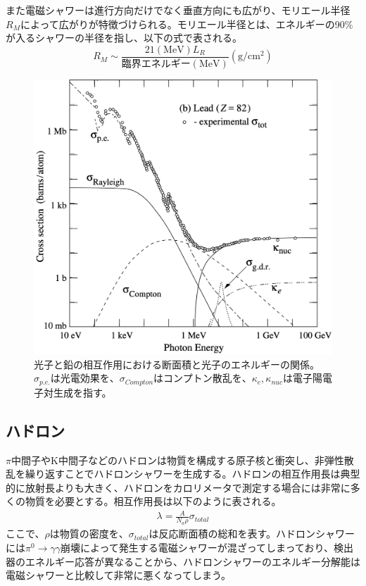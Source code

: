 また電磁シャワーは進行方向だけでなく垂直方向にも広がり、モリエール半径$R_M$によって広がりが特徴づけられる。モリエール半径とは、エネルギーの90$\%$が入るシャワーの半径を指し、以下の式で表される。
\begin{equation}
 \label{moliere}
 R_M \sim \frac{21 (\mathrm{MeV}) L_R}{臨界エネルギー (\mathrm{MeV})}  (\mathrm{g}/\mathrm{{cm}^2})
\end{equation}
\begin{figure}[h]
	\begin{center}
 \includegraphics[keepaspectratio, scale=0.4]
 	{Figure/Siwecal/photon_crosssection.png}
 		\caption[光子と鉛の相互作用における断面積と光子のエネルギー]{光子と鉛の相互作用における断面積と光子のエネルギーの関係。${\sigma}_{p.e.}$は光電効果を、${\sigma}_{Compton}$はコンプトン散乱を、${\kappa}_{e}, {\kappa}_{nuc}$は電子陽電子対生成を指す。}
 		\label{photon_cs}
	\end{center}
 \end{figure}
\subsection{ハドロン}
$\pi$中間子やK中間子などのハドロンは物質を構成する原子核と衝突し、非弾性散乱を繰り返すことでハドロンシャワーを生成する。ハドロンの相互作用長は典型的に放射長よりも大きく、ハドロンをカロリメータで測定する場合には非常に多くの物質を必要とする。相互作用長は以下のように表される。
\begin{align}
\lambda = \frac{A}{N_a \rho} \sigma_{total}
\end{align}
ここで、$\rho$は物質の密度を、$ \sigma_{total}$は反応断面積の総和を表す。ハドロンシャワーには${\pi}^0 \rightarrow \gamma \gamma$崩壊によって発生する電磁シャワーが混ざってしまっており、検出器のエネルギー応答が異なることから、ハドロンシャワーのエネルギー分解能は電磁シャワーと比較して非常に悪くなってしまう。

